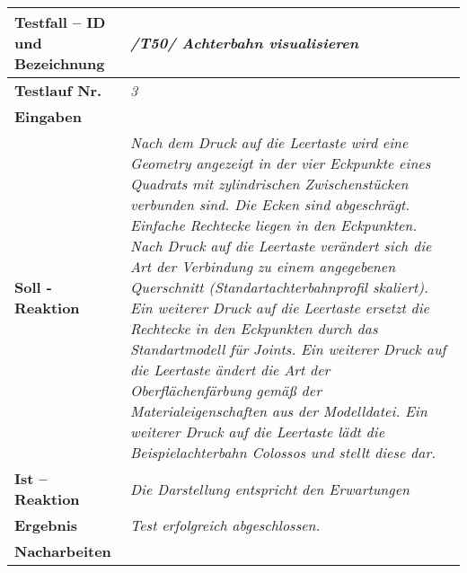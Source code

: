 \begin{longtable}{|p{7cm}|p{10cm}|}
\hline
\textbf{Testfall -- ID und Bezeichnung} & \textit{ /T50/ Achterbahn visualisieren} \\
\hline
\textbf{Testlauf Nr.} & \textit{3} \\
\hline
\textbf{Eingaben} & \textit{} \\
\hline
\textbf{Soll - Reaktion} & \textit{Nach dem Druck auf die Leertaste wird eine Geometry angezeigt in der vier Eckpunkte eines Quadrats mit zylindrischen Zwischenstücken verbunden sind. Die Ecken sind abgeschrägt. Einfache Rechtecke liegen in den Eckpunkten.
Nach Druck auf die Leertaste verändert sich die Art der Verbindung zu einem angegebenen Querschnitt (Standartachterbahnprofil skaliert). Ein weiterer Druck auf die Leertaste ersetzt die Rechtecke in den Eckpunkten durch 
das Standartmodell für Joints. Ein weiterer Druck auf die Leertaste ändert die Art der Oberflächenfärbung gemäß der Materialeigenschaften aus der Modelldatei. Ein weiterer Druck auf die Leertaste lädt die Beispielachterbahn Colossos und stellt diese dar.
} \\
\hline
\textbf{Ist -- Reaktion} & \textit{Die Darstellung entspricht den Erwartungen} \\
\hline
\textbf{Ergebnis} & \textit{Test erfolgreich abgeschlossen.} \\
\hline
\textbf{Nacharbeiten } & \textit{} \\
\hline
 \end{longtable}

